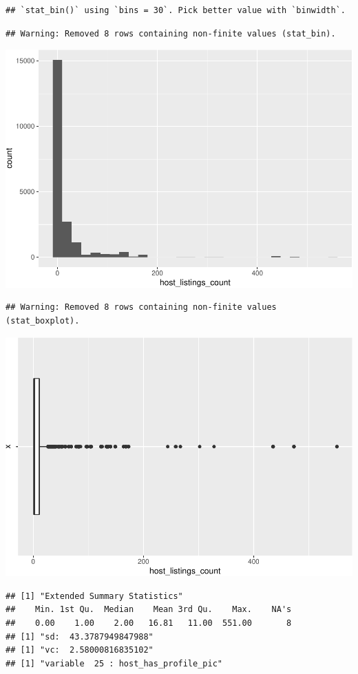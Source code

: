\begin{verbatim}
## `stat_bin()` using `bins = 30`. Pick better value with `binwidth`.
\end{verbatim}

\begin{verbatim}
## Warning: Removed 8 rows containing non-finite values (stat_bin).
\end{verbatim}

\includegraphics[width=0.5\linewidth]{anal_files/figure-latex/figures-side-6}

\begin{verbatim}
## Warning: Removed 8 rows containing non-finite values (stat_boxplot).
\end{verbatim}

\includegraphics[width=0.5\linewidth]{anal_files/figure-latex/figures-side-7}

\begin{verbatim}
## [1] "Extended Summary Statistics"
##    Min. 1st Qu.  Median    Mean 3rd Qu.    Max.    NA's 
##    0.00    1.00    2.00   16.81   11.00  551.00       8 
## [1] "sd:  43.3787949847988"
## [1] "vc:  2.58000816835102"
## [1] "variable  25 : host_has_profile_pic"
\end{verbatim}

